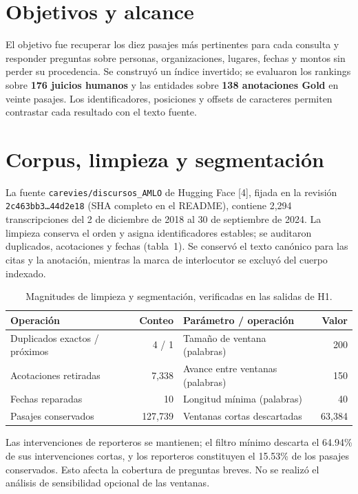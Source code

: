 \documentclass[10pt,a4paper]{article}
\newcommand{\tabfont}{\fontsize{9.1}{11.4}\selectfont}
\begin{document}
\section{Objetivos y alcance}
El objetivo fue recuperar los diez pasajes más pertinentes para cada consulta y responder preguntas sobre personas, organizaciones, lugares, fechas y montos sin perder su procedencia. Se construyó un índice invertido; se evaluaron los rankings sobre \textbf{176 juicios humanos} y las entidades sobre \textbf{138 anotaciones Gold} en veinte pasajes. Los identificadores, posiciones y offsets de caracteres permiten contrastar cada resultado con el texto fuente.

\section{Corpus, limpieza y segmentación}
La fuente \texttt{carevies/discursos\_AMLO} de Hugging Face [4], fijada en la revisión \texttt{2c463bb3\ldots44d2e18} (SHA completo en el README), contiene 2,294 transcripciones del 2 de diciembre de 2018 al 30 de septiembre de 2024. La limpieza conserva el orden y asigna identificadores estables; se auditaron duplicados, acotaciones y fechas (tabla~1). Se conservó el texto canónico para las citas y la anotación, mientras la marca de interlocutor se excluyó del cuerpo indexado.

\begin{table}[H]
\centering\tabfont
\caption{Magnitudes de limpieza y segmentación, verificadas en las salidas de H1.}
\begin{tabularx}{\linewidth}{@{}XrXr@{}}
\toprule
\textbf{Operación} & \textbf{Conteo} & \textbf{Parámetro / operación} & \textbf{Valor}\\
\midrule
Duplicados exactos / próximos & 4 / 1 & Tamaño de ventana (palabras) & 200\\
Acotaciones retiradas & 7,338 & Avance entre ventanas (palabras) & 150\\
Fechas reparadas & 10 & Longitud mínima (palabras) & 40\\
Pasajes conservados & 127,739 & Ventanas cortas descartadas & 63,384\\
\bottomrule
\end{tabularx}
\end{table}
Las intervenciones de reporteros se mantienen; el filtro mínimo descarta el 64.94\% de sus intervenciones cortas, y los reporteros constituyen el 15.53\% de los pasajes conservados. Esto afecta la cobertura de preguntas breves. No se realizó el análisis de sensibilidad opcional de las ventanas.
\end{document}
